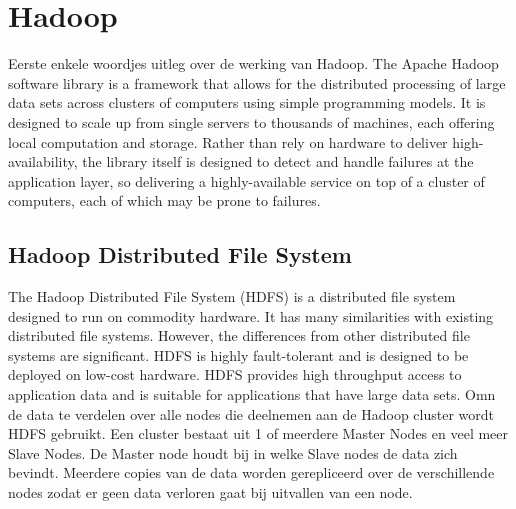 \section{Hadoop}
Eerste enkele woordjes uitleg over de werking van Hadoop.
\newline
\newline
The Apache Hadoop software library is a framework that allows for the distributed processing of large data sets across clusters of computers using simple programming models. It is designed to scale up from single servers to thousands of machines, each offering local computation and storage. Rather than rely on hardware to deliver high-availability, the library itself is designed to detect and handle failures at the application layer, so delivering a highly-available service on top of a cluster of computers, each of which may be prone to failures.\autocite{ASF2022}

\subsection{Hadoop Distributed File System}
The Hadoop Distributed File System (HDFS) is a distributed file system designed to run on commodity hardware. It has many similarities with existing distributed file systems.
However, the differences from other distributed file systems are significant. HDFS is highly fault-tolerant and is designed to be deployed on low-cost hardware. HDFS provides high throughput access to application data and is suitable for applications that have large data sets.\autocite{Borthakur2007a}
\newline
\newline
Omn de data te verdelen over alle nodes die deelnemen aan de Hadoop cluster wordt HDFS gebruikt. Een cluster bestaat uit 1 of meerdere Master Nodes en veel meer Slave Nodes. De Master node houdt bij in welke Slave nodes de data zich bevindt. Meerdere copies van de data worden gerepliceerd over de verschillende nodes zodat er geen data verloren gaat bij uitvallen van een node.

